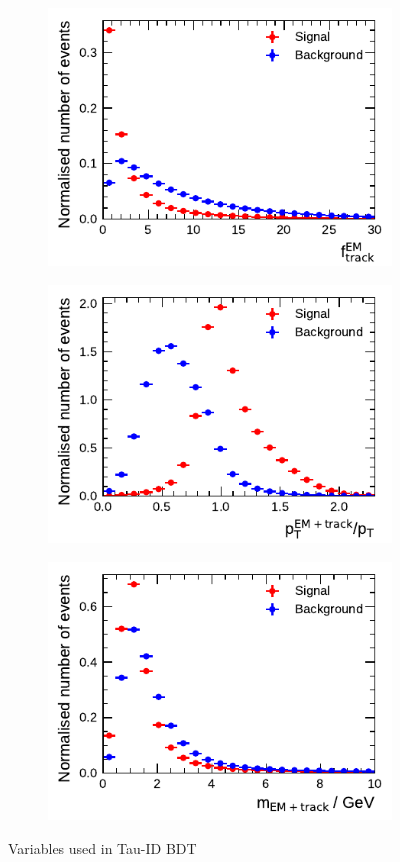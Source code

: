 \begin{figure}[!ht]\ContinuedFloat
  \begin{subfigure}{0.5\textwidth}
    \centering
    \includegraphics{./figures/baseline_bdt_vars/1p/EMPOverTrkSysP.pdf}
  \end{subfigure}%
  \begin{subfigure}{0.5\textwidth}
    \centering
    \includegraphics{./figures/baseline_bdt_vars/1p/ptRatioEflowApprox.pdf}
  \end{subfigure}
  \begin{subfigure}{0.5\textwidth}
    \centering
    \includegraphics{./figures/baseline_bdt_vars/1p/mEflowApprox.pdf}
  \end{subfigure}
  \caption[]{Variables used in Tau-ID BDT}
\end{figure}
